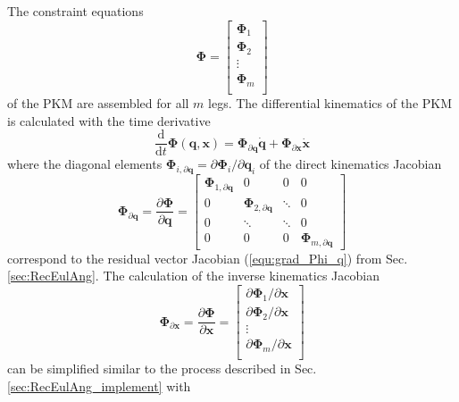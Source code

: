 \documentclass[twocolumn,10pt]{IFTOMM}
\newcommand{\bm}[1]{\boldsymbol{#1}}
\begin{document}
The constraint equations
%
\begin{equation}
\bm{\Phi}
=
\begin{bmatrix}
\bm{\Phi}_1 \\
\bm{\Phi}_2 \\
\vdots \\
\bm{\Phi}_m \\
\end{bmatrix}
\end{equation}
%
of the PKM are assembled for all $m$ legs.
The differential kinematics of the PKM is calculated with the time derivative
%
\begin{equation}
\frac{\mathrm{d}}{{\mathrm{d}}t} \bm{\Phi}(\bm{q},\bm{x})
=
\bm{\Phi}_{\partial \bm{q}}  \dot{\bm{q}}
+
\bm{\Phi}_{\partial \bm{x}} \dot{\bm{x}}
\end{equation}
%
where the diagonal elements $\bm{\Phi}_{i,\partial \bm{q}}=\partial \bm{\Phi}_i / \partial \bm{q}_i$ of the direct kinematics Jacobian
%
\begin{equation}
\bm{\Phi}_{\partial \bm{q}}
=
\frac{\partial \bm{\Phi}}{\partial \bm{q}}
=
\begin{bmatrix}
\bm{\Phi}_{1,\partial \bm{q}}  & 0 & 0 & 0\\
0 & \bm{\Phi}_{2,\partial \bm{q}} & \ddots & 0  \\
0 & \ddots & \ddots & 0  \\
0 & 0 & 0 &\bm{\Phi}_{m,\partial \bm{q}}
\end{bmatrix}
\label{equ:PKM_phi_grad_q}
\end{equation}  
%
correspond to the residual vector Jacobian (\ref{equ:grad_Phi_q}) from Sec.\,\ref{sec:RecEulAng}.
The calculation of the inverse kinematics Jacobian
%
\begin{equation}
\bm{\Phi}_{\partial \bm{x}}
=
\frac{\partial \bm{\Phi}}{\partial \bm{x}}
=
\begin{bmatrix}
\partial \bm{\Phi}_1/\partial \bm{x}\\
\partial \bm{\Phi}_2/\partial \bm{x}\\
\vdots \\
\partial \bm{\Phi}_m/\partial \bm{x}\\
\end{bmatrix}
\label{equ:PKM_phi_grad_x}
\end{equation}  
%
can be simplified similar to the process described in Sec.\,\ref{sec:RecEulAng_implement} with
%
\end{document}
